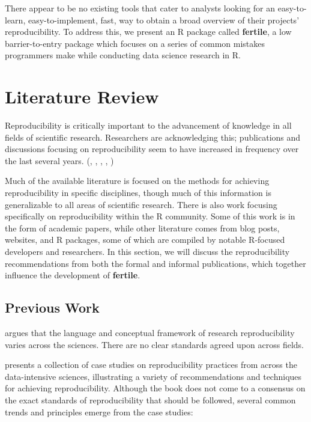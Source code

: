 \documentclass[APA,LATO1COL]{WileyNJD-v2}
\begin{document}
There appear to be no existing tools that cater to analysts looking for an easy-to-learn, easy-to-implement, fast, way to obtain a broad overview of their projects' reproducibility. To address this, we present an R package called \textbf{fertile}, a low barrier-to-entry package which focuses on a series of common mistakes programmers make while conducting data science research in R.



\section{Literature Review}\label{sec2}


Reproducibility is critically important to the advancement of knowledge in all fields of scientific research. Researchers are acknowledging this; publications and discussions focusing on reproducibility seem to have increased in frequency over the last several years. (\cite{sep-scientific-reproducibility}, \cite{plos-biology}, \cite{bioessays-gosselin}, \cite{eisner-reproducibility}, \cite{engineering-reproducibility})

Much of the available literature is focused on the methods for achieving reproducibility in specific disciplines, though much of this information is generalizable to all areas of scientific research. There is also work focusing specifically on reproducibility within the R community. Some of this work is in the form of academic papers, while other literature comes from blog posts, websites, and R packages, some of which are compiled by notable R-focused developers and researchers. In this section, we will discuss the reproducibility recommendations from both the formal and informal publications, which together influence the development of \textbf{fertile}.


\subsection{Previous Work}

\cite{Goodman341ps12} argues that the language and conceptual framework of research reproducibility varies across the sciences. There are no clear standards agreed upon across fields.

\cite{kitzes2017practice} presents a collection of case studies on reproducibility practices from across the data-intensive sciences, illustrating a variety of recommendations and techniques for achieving reproducibility. Although the book does not come to a consensus on the exact standards of reproducibility that should be followed, several common trends and principles emerge from the case studies:
\end{document}
